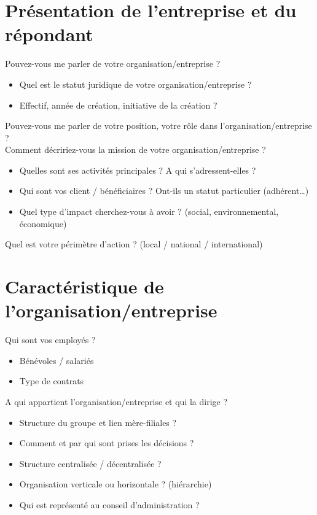        
\section*{Présentation de l’entreprise et du répondant }
Pouvez-vous me parler de votre organisation/entreprise ? 
    \begin{itemize}
    	\item Quel est le statut juridique de votre organisation/entreprise ? 
    	\item Effectif, année de création, initiative de la création ? \\
	\end{itemize} 

Pouvez-vous me parler de votre position, votre rôle dans l’organisation/entreprise ? \\

Comment décririez-vous la mission de votre organisation/entreprise ?  
    \begin{itemize}
        \item Quelles sont ses activités principales ? A qui s’adressent-elles ? 
        \item Qui sont vos client / bénéficiaires ? Ont-ils un statut particulier (adhérent…)
        \item Quel type d’impact cherchez-vous à avoir ? (social, environnemental, économique) \\
    \end{itemize}
	
Quel est votre périmètre d’action ? (local / national / international) 

\section*{Caractéristique de l’organisation/entreprise}
Qui sont vos employés ? 
\begin{itemize}
    \item Bénévoles / salariés
    \item Type de contrats  \\
\end{itemize}

A qui appartient l’organisation/entreprise et qui la dirige ?
    \begin{itemize}
        \item Structure du groupe et lien mère-filiales ?
        \item Comment et par qui sont prises les décisions ? 
        \item Structure centralisée / décentralisée ? 
        \item Organisation verticale ou horizontale ? (hiérarchie)
        \item Qui est représenté au conseil d’administration ?  \\
    \end{itemize}

